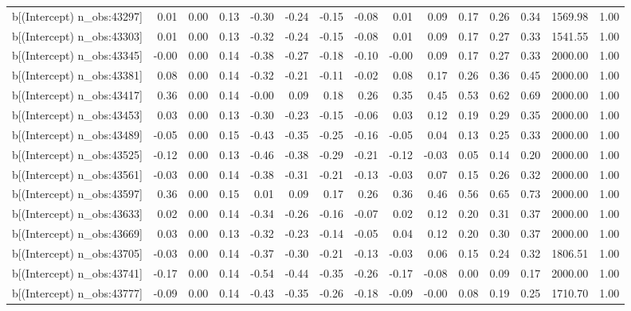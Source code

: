 \begin{table}[ht]
\begin{tabular}{rrrrrrrrrrrrrrr}
  b[(Intercept) n\_obs:43297] & 0.01 & 0.00 & 0.13 & -0.30 & -0.24 & -0.15 & -0.08 & 0.01 & 0.09 & 0.17 & 0.26 & 0.34 & 1569.98 & 1.00 \\ 
  b[(Intercept) n\_obs:43303] & 0.01 & 0.00 & 0.13 & -0.32 & -0.24 & -0.15 & -0.08 & 0.01 & 0.09 & 0.17 & 0.27 & 0.33 & 1541.55 & 1.00 \\ 
  b[(Intercept) n\_obs:43345] & -0.00 & 0.00 & 0.14 & -0.38 & -0.27 & -0.18 & -0.10 & -0.00 & 0.09 & 0.17 & 0.27 & 0.33 & 2000.00 & 1.00 \\ 
  b[(Intercept) n\_obs:43381] & 0.08 & 0.00 & 0.14 & -0.32 & -0.21 & -0.11 & -0.02 & 0.08 & 0.17 & 0.26 & 0.36 & 0.45 & 2000.00 & 1.00 \\ 
  b[(Intercept) n\_obs:43417] & 0.36 & 0.00 & 0.14 & -0.00 & 0.09 & 0.18 & 0.26 & 0.35 & 0.45 & 0.53 & 0.62 & 0.69 & 2000.00 & 1.00 \\ 
  b[(Intercept) n\_obs:43453] & 0.03 & 0.00 & 0.13 & -0.30 & -0.23 & -0.15 & -0.06 & 0.03 & 0.12 & 0.19 & 0.29 & 0.35 & 2000.00 & 1.00 \\ 
  b[(Intercept) n\_obs:43489] & -0.05 & 0.00 & 0.15 & -0.43 & -0.35 & -0.25 & -0.16 & -0.05 & 0.04 & 0.13 & 0.25 & 0.33 & 2000.00 & 1.00 \\ 
  b[(Intercept) n\_obs:43525] & -0.12 & 0.00 & 0.13 & -0.46 & -0.38 & -0.29 & -0.21 & -0.12 & -0.03 & 0.05 & 0.14 & 0.20 & 2000.00 & 1.00 \\ 
  b[(Intercept) n\_obs:43561] & -0.03 & 0.00 & 0.14 & -0.38 & -0.31 & -0.21 & -0.13 & -0.03 & 0.07 & 0.15 & 0.26 & 0.32 & 2000.00 & 1.00 \\ 
  b[(Intercept) n\_obs:43597] & 0.36 & 0.00 & 0.15 & 0.01 & 0.09 & 0.17 & 0.26 & 0.36 & 0.46 & 0.56 & 0.65 & 0.73 & 2000.00 & 1.00 \\ 
  b[(Intercept) n\_obs:43633] & 0.02 & 0.00 & 0.14 & -0.34 & -0.26 & -0.16 & -0.07 & 0.02 & 0.12 & 0.20 & 0.31 & 0.37 & 2000.00 & 1.00 \\ 
  b[(Intercept) n\_obs:43669] & 0.03 & 0.00 & 0.13 & -0.32 & -0.23 & -0.14 & -0.05 & 0.04 & 0.12 & 0.20 & 0.30 & 0.37 & 2000.00 & 1.00 \\ 
  b[(Intercept) n\_obs:43705] & -0.03 & 0.00 & 0.14 & -0.37 & -0.30 & -0.21 & -0.13 & -0.03 & 0.06 & 0.15 & 0.24 & 0.32 & 1806.51 & 1.00 \\ 
  b[(Intercept) n\_obs:43741] & -0.17 & 0.00 & 0.14 & -0.54 & -0.44 & -0.35 & -0.26 & -0.17 & -0.08 & 0.00 & 0.09 & 0.17 & 2000.00 & 1.00 \\ 
  b[(Intercept) n\_obs:43777] & -0.09 & 0.00 & 0.14 & -0.43 & -0.35 & -0.26 & -0.18 & -0.09 & -0.00 & 0.08 & 0.19 & 0.25 & 1710.70 & 1.00 \\ 

\end{tabular}
\end{table}

